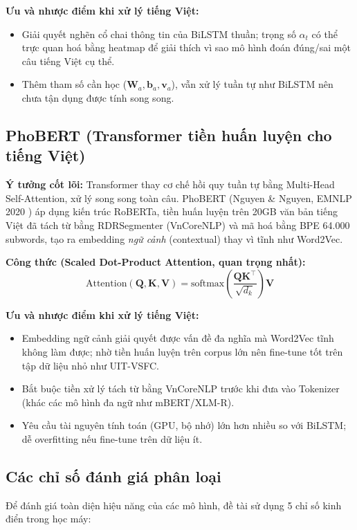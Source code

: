 \documentclass[12pt,a4paper]{article}
\begin{document}
\textbf{Ưu và nhược điểm khi xử lý tiếng Việt:}
\begin{itemize}[leftmargin=1.0cm, itemsep=2pt]
    \item[+] Giải quyết nghẽn cổ chai thông tin của BiLSTM thuần; trọng số $\alpha_t$ có thể trực quan hoá bằng heatmap để giải thích vì sao mô hình đoán đúng/sai một câu tiếng Việt cụ thể.
    \item[--] Thêm tham số cần học ($\mathbf{W}_a, \mathbf{b}_a, \mathbf{v}_a$), vẫn xử lý tuần tự như BiLSTM nên chưa tận dụng được tính song song.
\end{itemize}

\subsection{PhoBERT (Transformer tiền huấn luyện cho tiếng Việt)}\label{sec:transformer_phobert}\label{sec:phobert_model}
\textbf{Ý tưởng cốt lõi:} Transformer \cite{vaswani2017attention} thay cơ chế hồi quy tuần tự bằng Multi-Head Self-Attention, xử lý song song toàn câu. PhoBERT (Nguyen \& Nguyen, EMNLP 2020 \cite{nguyen2020phobert}) áp dụng kiến trúc RoBERTa, tiền huấn luyện trên 20GB văn bản tiếng Việt đã tách từ bằng RDRSegmenter (VnCoreNLP) và mã hoá bằng BPE 64.000 subwords, tạo ra embedding \textit{ngữ cảnh} (contextual) thay vì tĩnh như Word2Vec.

\textbf{Công thức (Scaled Dot-Product Attention, quan trọng nhất):}
\begin{equation}
    \text{Attention}(\mathbf{Q}, \mathbf{K}, \mathbf{V}) = \text{softmax}\left(\frac{\mathbf{Q}\mathbf{K}^\top}{\sqrt{d_k}}\right)\mathbf{V}
\end{equation}

\textbf{Ưu và nhược điểm khi xử lý tiếng Việt:}
\begin{itemize}[leftmargin=1.0cm, itemsep=2pt]
    \item[+] Embedding ngữ cảnh giải quyết được vấn đề đa nghĩa mà Word2Vec tĩnh không làm được; nhờ tiền huấn luyện trên corpus lớn nên fine-tune tốt trên tập dữ liệu nhỏ như UIT-VSFC.
    \item[--] Bắt buộc tiền xử lý tách từ bằng VnCoreNLP trước khi đưa vào Tokenizer (khác các mô hình đa ngữ như mBERT/XLM-R).
    \item[--] Yêu cầu tài nguyên tính toán (GPU, bộ nhớ) lớn hơn nhiều so với BiLSTM; dễ overfitting nếu fine-tune trên dữ liệu ít.
\end{itemize}


\subsection{Các chỉ số đánh giá phân loại}\label{sec:metrics}
Để đánh giá toàn diện hiệu năng của các mô hình, đề tài sử dụng 5 chỉ số kinh điển trong học máy:
\end{document}
